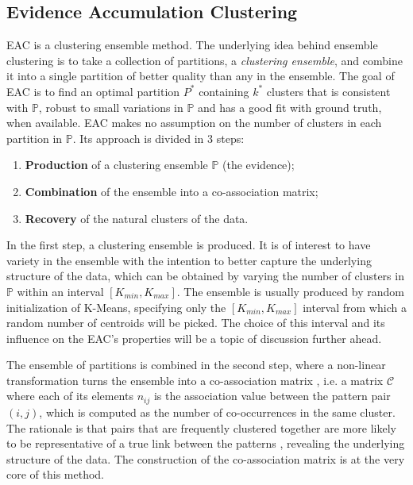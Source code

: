 \subsection{Evidence Accumulation Clustering}

EAC is a clustering ensemble method.
The underlying idea behind ensemble clustering is to take a collection of partitions, a \emph{clustering ensemble}, and combine it into a single partition of better quality than any in the ensemble.
The goal of EAC is to find an optimal partition $P^*$ containing $k^*$ clusters that is consistent with $\mathbb{P}$, robust to small variations in $\mathbb{P}$ and has a good fit with ground truth, when available.
EAC makes no assumption on the number of clusters in each partition in $\mathbb{P}$.
Its approach is divided in 3 steps:

\begin{enumerate}
\item \textbf{Production} of a clustering ensemble $\mathbb{P}$ (the evidence);
\item \textbf{Combination} of the ensemble into a co-association matrix;
\item \textbf{Recovery} of the natural clusters of the data.
\end{enumerate}

In the first step, a clustering ensemble is produced.
It is of interest to have variety in the ensemble with the intention to better capture the underlying structure of the data, which can be obtained by varying the number of clusters in $\mathbb{P}$ within an interval $[K_{min}, K_{max}]$.
The ensemble is usually produced by random initialization of K-Means, specifying only the $[K_{min}, K_{max}]$ interval from which a random number of centroids will be picked.
The choice of this interval and its influence on the EAC's properties will be a topic of discussion further ahead.

The ensemble of partitions is combined in the second step, where a non-linear transformation turns the ensemble into a co-association matrix \cite{Fred2005}, i.e. a matrix $\mathcal{C}$ where each of its elements $n_{ij}$ is the association value between the pattern pair $(i,j)$, which is computed as the number of co-occurrences in the same cluster.
The rationale is that pairs that are frequently clustered together are more likely to be representative of a true link between the patterns \cite{Fred2002}, revealing the underlying structure of the data.
The construction of the co-association matrix is at the very core of this method.

